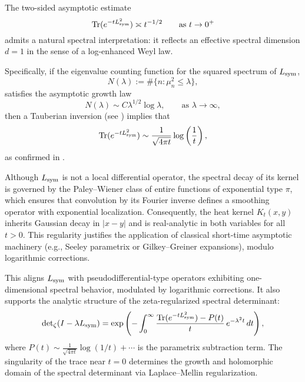 \begin{remark}
\label{rem:spectral_dimension}
The two-sided asymptotic estimate
\[
\operatorname{Tr}(e^{-t L_{\mathrm{sym}}^2}) \asymp t^{-1/2} \qquad \text{as } t \to 0^+
\]
admits a natural spectral interpretation: it reflects an effective spectral dimension \( d = 1 \) in the sense of a log-enhanced Weyl law.

\medskip
\noindent
Specifically, if the eigenvalue counting function for the squared spectrum of \( L_{\mathrm{sym}} \),
\[
N(\lambda) := \#\{ n : \mu_n^2 \le \lambda \},
\]
satisfies the asymptotic growth law
\[
N(\lambda) \sim C \lambda^{1/2} \log \lambda, \qquad \text{as } \lambda \to \infty,
\]
then a Tauberian inversion (see ) implies that
\[
\operatorname{Tr}(e^{-t L_{\mathrm{sym}}^2}) \sim \frac{1}{\sqrt{4\pi t}} \log\left( \frac{1}{t} \right),
\]
as confirmed in .

\medskip
\noindent
Although \( L_{\mathrm{sym}} \) is not a local differential operator, the spectral decay of its kernel is governed by the Paley--Wiener class of entire functions of exponential type \( \pi \), which ensures that convolution by its Fourier inverse defines a smoothing operator with exponential localization. Consequently, the heat kernel \( K_t(x,y) \) inherits Gaussian decay in \( |x - y| \) and is real-analytic in both variables for all \( t > 0 \). This regularity justifies the application of classical short-time asymptotic machinery (e.g., Seeley parametrix or Gilkey–Greiner expansions), modulo logarithmic corrections.

\medskip
\noindent
This aligns \( L_{\mathrm{sym}} \) with pseudodifferential-type operators exhibiting one-dimensional spectral behavior, modulated by logarithmic corrections. It also supports the analytic structure of the zeta-regularized spectral determinant:
\[
\det\nolimits_\zeta(I - \lambda L_{\mathrm{sym}}) = \exp\left( - \int_0^\infty \frac{\operatorname{Tr}(e^{-t L_{\mathrm{sym}}^2}) - P(t)}{t} \, e^{-\lambda^2 t} \, dt \right),
\]
where \( P(t) \sim \frac{1}{\sqrt{4\pi t}} \log(1/t) + \cdots \) is the parametrix subtraction term. The singularity of the trace near \( t = 0 \) determines the growth and holomorphic domain of the spectral determinant via Laplace--Mellin regularization.
\end{remark}
